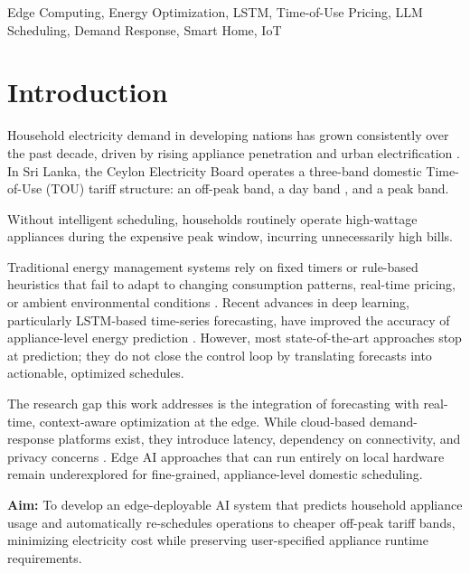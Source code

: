 \documentclass[conference]{IEEEtran}
\begin{document}
\begin{IEEEkeywords}
Edge Computing, Energy Optimization, LSTM, Time-of-Use Pricing,
LLM Scheduling, Demand Response, Smart Home, IoT
\end{IEEEkeywords}

\section{Introduction}
\label{sec:intro}

Household electricity demand in developing nations has grown
consistently over the past decade, driven by rising appliance
penetration and urban electrification \cite{zhu2022green}.
In Sri Lanka, the Ceylon Electricity Board operates a three-band
domestic Time-of-Use (TOU) tariff structure: an off-peak band, a day band
, and a peak band.

Without intelligent scheduling, households routinely operate
high-wattage appliances during the expensive peak window,
incurring unnecessarily high bills.

Traditional energy management systems rely on fixed timers or
rule-based heuristics that fail to adapt to changing consumption
patterns, real-time pricing, or ambient environmental conditions
\cite{lekidis2023edge}.
Recent advances in deep learning, particularly LSTM-based
time-series forecasting, have improved the accuracy of appliance-level
energy prediction \cite{severiche2025forecasting,zhao2024residential}.
However, most state-of-the-art approaches stop at prediction;
they do not close the control loop by translating forecasts into
actionable, optimized schedules.

The research gap this work addresses is the integration of
forecasting with real-time, context-aware optimization at the edge.
While cloud-based demand-response platforms exist, they introduce
latency, dependency on connectivity, and privacy concerns
\cite{zawish2023energy,ali2023iot}.
Edge AI approaches that can run entirely on local hardware remain
underexplored for fine-grained, appliance-level domestic scheduling.

\textbf{Aim:} To develop an edge-deployable AI system that predicts
household appliance usage and automatically re-schedules operations
to cheaper off-peak tariff bands, minimizing electricity cost while
preserving user-specified appliance runtime requirements.
\end{document}

